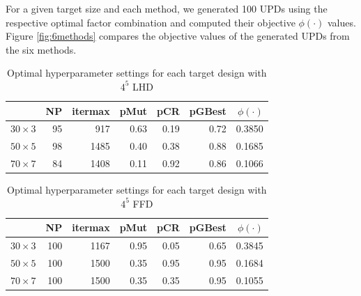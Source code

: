 \documentclass [PhD] {package/uclathes}
\begin{document}

{For a given target size and each method, we generated 100 UPDs using the respective optimal factor combination and computed their objective $\phi(\cdot)$ values.}  Figure \ref{fig:6methods} compares the objective values of the generated UPDs from the six methods.


\begin{table}

\caption{\label{tab:lhd_optim}Optimal hyperparameter settings for each target design with $4^5$ LHD}
\centering
\begin{tabular}[t]{l|r|r|r|r|r|r}
\hline
  & NP & itermax & pMut & pCR & pGBest & $\phi(\cdot)$\\
\hline
$30\times3$ & 95 & 917 & 0.63 & 0.19 & 0.72 & 0.3850\\
\hline
$50\times5$ & 98 & 1485 & 0.40 & 0.38 & 0.88 & 0.1685\\
\hline
$70\times7$ & 84 & 1408 & 0.11 & 0.92 & 0.86 & 0.1066\\
\hline
\end{tabular}
\end{table}\begin{table}

\caption{\label{tab:grid_optim}Optimal hyperparameter settings for each target design with $4^5$ FFD}
\centering
\begin{tabular}[t]{l|r|r|r|r|r|r}
\hline
  & NP & itermax & pMut & pCR & pGBest & $\phi(\cdot)$\\
\hline
$30\times3$ & 100 & 1167 & 0.95 & 0.05 & 0.65 & 0.3845\\
\hline
$50\times5$ & 100 & 1500 & 0.35 & 0.95 & 0.95 & 0.1684\\
\hline
$70\times7$ & 100 & 1500 & 0.35 & 0.35 & 0.95 & 0.1055\\
\hline
\end{tabular}
\end{table}
\end{document}

